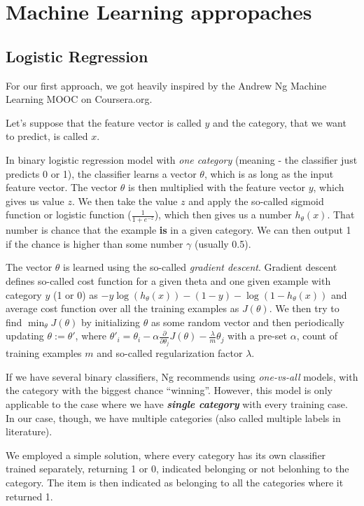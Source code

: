 \documentclass[letterpaper]{article}
\begin{document}
\section{Machine Learning appropaches}
\subsection{Logistic Regression}
For our first approach, we got heavily inspired by the Andrew Ng Machine Learning MOOC  on Coursera.org.

Let's suppose that the feature vector is called $y$ and the category, that we want to predict, is called $x$.

In binary logistic regression model with \emph{one category} (meaning - the classifier just predicts 0 or 1), the classifier learns a vector $\theta$, which is as long as the input feature vector. The vector $\theta$ is then multiplied with the feature vector $y$, which gives us value $z$. We then take the value $z$ and apply the so-called sigmoid function or logistic function ($\frac{1}{1+e^{-z}}$), which then gives us a number $h_\theta(x)$. That number is chance that the example \textbf{is} in a given category. We can then output 1 if the chance is higher than some number $\gamma$ (usually 0.5).

The vector $\theta$ is learned using the so-called \emph{gradient descent}. Gradient descent defines so-called cost function for a given theta and one given example with category $y$ (1 or 0) as $-y \log(h_\theta(x))-(1-y)-\log(1-h_\theta(x))$ and average cost function over all the training examples as $J(\theta)$. We then try to find $\min_\theta J(\theta)$ by initializing $\theta$ as some random vector and then periodically updating $\theta:=\theta'$, where $\theta'_i=\theta_i-\alpha\frac{\partial}{\partial \theta_j}J(\theta)-\frac{\lambda}{m}\theta_j$ with a pre-set $\alpha$, count of training examples $m$ and so-called regularization factor $\lambda$.

If we have several binary classifiers, Ng recommends using \emph{one-vs-all} models, with the category with the biggest chance ``winning''. However, this model is only applicable to the case where we have \textbf{\emph{single category}} with every training case. 
In our case, though, we have multiple categories (also called multiple labels in literature). 

We employed a simple solution, where every category has its own classifier trained separately, returning 1 or 0, indicated 
belonging or not belonhing to the category. The item is then indicated as belonging to all the categories where it returned 1.
\end{document}
